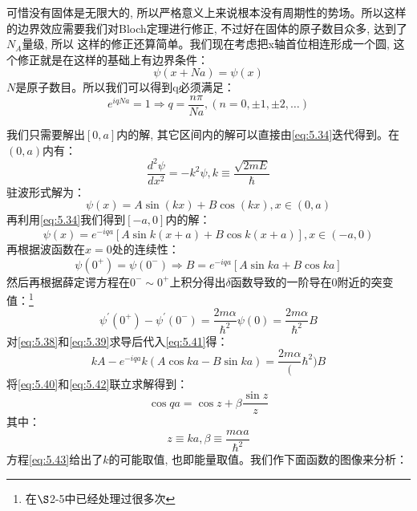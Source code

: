 可惜没有固体是无限大的, 所以严格意义上来说根本没有周期性的势场。所以这样的边界效应需要我们对Bloch定理进行修正, 不过好在固体的原子数目众多, 达到了$N_A$量级, 所以
这样的修正还算简单。我们现在考虑把x轴首位相连形成一个圆, 这个修正就是在这样的基础上有边界条件：
\begin{equation}
    \psi(x+Na)=\psi(x)
\end{equation}
$N$是原子数目。所以我们可以得到q必须满足：
\begin{equation}
    \label{eq:5.36}
    e^{iqNa}=1\Rightarrow q=\frac{n\pi}{Na},(n=0,\pm 1,\pm 2,\ldots)
\end{equation}

我们只需要解出$[0,a]$内的解, 其它区间内的解可以直接由\ref{eq:5.34}迭代得到。在$(0,a)$内有：
\begin{equation}
    \frac{d^2\psi}{dx^2}=-k^2\psi,k\equiv\frac{\sqrt{2mE}}{\hbar}
\end{equation}
驻波形式解为：
\begin{equation}
    \label{eq:5.38}
    \psi(x)=A\sin(kx)+B\cos(kx),x\in(0,a)
\end{equation}
再利用\ref{eq:5.34}我们得到$[-a,0]$内的解：
\begin{equation}
    \label{eq:5.39}
   \psi(x)=e^{-iqa}\left[A\sin k(x+a)+B\cos k(x+a)\right] ,x\in(-a,0)
\end{equation}
再根据波函数在$x=0$处的连续性：
\begin{equation}
    \label{eq:5.40}
    \psi(0^+)=\psi(0^-)\Rightarrow B=e^{-iqa}\left[A\sin ka+B\cos ka\right]
\end{equation}
然后再根据薛定谔方程在$0^-\sim 0^+$上积分得出$\delta$函数导致的一阶导在$0$附近的突变值：\footnote{在$\S$2-5中已经处理过很多次}
\begin{equation}
    \label{eq:5.41}
    \psi^\prime(0^+)-\psi^\prime(0^-)=\frac{2m\alpha}{\hbar^2}\psi(0)=\frac{2m\alpha}{\hbar^2}B
\end{equation}
对\ref{eq:5.38}和\ref{eq:5.39}求导后代入\ref{eq:5.41}得：
\begin{equation}
    \label{eq:5.42}
    kA-e^{-iqa}k\left(A \cos ka-B\sin ka\right)=\frac{2m\alpha}(\hbar^2) B
\end{equation}
将\ref{eq:5.40}和\ref{eq:5.42}联立求解得到：
\begin{equation}
    \label{eq:5.43}
    \cos qa=\cos z+\beta\frac{\sin z}{z}
\end{equation}
其中：
\[z\equiv ka, \beta\equiv\frac{m\alpha a}{\hbar^2} \]
方程\ref{eq:5.43}给出了$k$的可能取值, 也即能量取值。我们作下面函数的图像来分析：

